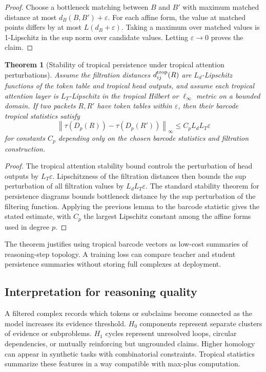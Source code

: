 \documentclass[11pt]{article}
\newtheorem{theorem}[definition]{Theorem}
\newcommand{\norm}[1]{\left\lVert #1\right\rVert}
\newcommand{\eps}{\varepsilon}
\begin{document}
\begin{proof}
Choose a bottleneck matching between \(B\) and \(B'\) with maximum matched distance at most \(d_B(B,B')+\eps\).  For each affine form, the value at matched points differs by at most \(L(d_B+\eps)\).  Taking a maximum over matched values is 1-Lipschitz in the sup norm over candidate values.  Letting \(\eps\to0\) proves the claim.
\end{proof}

\begin{theorem}[Stability of tropical persistence under tropical attention perturbations]
Assume the filtration distances \(d_{ij}^{\rm trop}(R)\) are \(L_d\)-Lipschitz functions of the token table and tropical head outputs, and assume each tropical attention layer is \(L_T\)-Lipschitz in the tropical Hilbert or \(\ell_\infty\) metric on a bounded domain.  If two packets \(R,R'\) have token tables within \(\eps\), then their barcode tropical statistics satisfy
\begin{equation}
\norm{\tau(D_p(R))-\tau(D_p(R'))}_\infty\le C_p L_d L_T \eps
\end{equation}
for constants \(C_p\) depending only on the chosen barcode statistics and filtration construction.
\end{theorem}

\begin{proof}
The tropical attention stability bound controls the perturbation of head outputs by \(L_T\eps\).  Lipschitzness of the filtration distances then bounds the sup perturbation of all filtration values by \(L_dL_T\eps\).  The standard stability theorem for persistence diagrams bounds bottleneck distance by the sup perturbation of the filtering function.  Applying the previous lemma to the barcode statistic gives the stated estimate, with \(C_p\) the largest Lipschitz constant among the affine forms used in degree \(p\).
\end{proof}

The theorem justifies using tropical barcode vectors as low-cost summaries of reasoning-step topology.  A training loss can compare teacher and student persistence summaries without storing full complexes at deployment.

\subsection{Interpretation for reasoning quality}

A filtered complex records which tokens or subclaims become connected as the model increases its evidence threshold.  \(H_0\) components represent separate clusters of evidence or subproblems.  \(H_1\) cycles represent unresolved loops, circular dependencies, or mutually reinforcing but ungrounded claims.  Higher homology can appear in synthetic tasks with combinatorial constraints.  Tropical statistics summarize these features in a way compatible with max-plus computation.
\end{document}
